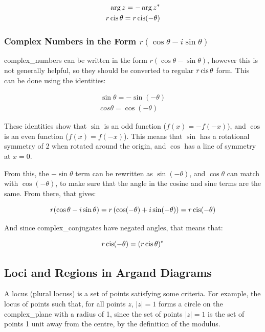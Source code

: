         \begin{align}
            \arg z=-\arg z^* \\
            r\operatorname{cis}\theta=r\operatorname{cis}(-\theta)
        \end{align}

        \subsubsection{Complex Numbers in the Form \texorpdfstring{$r(\cos\theta-i\sin\theta)$}{\textit{r(}cos\textit{θ-i}sin\textit{θ)}}} %
            \Glspl{complex_number} can be written in the form $r(\cos\theta-\sin\theta)$, however this is not generally helpful, so they should be converted to regular $r\operatorname{cis}\theta$ form.
            This can be done using the identities:

            \begin{align}
                \sin\theta=-\sin(-\theta) \\
                cos\theta=\cos(-\theta)
            \end{align}

            These identities show that $\sin$ is an odd \gls{function} ($f(x)=-f(-x)$), and $\cos$ is an even \gls{function} ($f(x)=f(-x)$).
            This means that $\sin$ has a rotational symmetry of 2 when rotated around the origin, and $\cos$ has a line of symmetry at $x=0$.

            From this, the $-\sin\theta$ term can be rewritten as $\sin(-\theta)$, and $\cos\theta$ can match with $\cos(-\theta)$, to make sure that the angle in the \gls{cosine} and \gls{sine} terms are the same.
            From there, that gives:

            \begin{equation}
                r(\cos\theta-i\sin\theta)=r\left(\cos(-\theta)+i\sin(-\theta)\right)=r\operatorname{cis}(-\theta)
            \end{equation}

            And since \glspl{complex_conjugate} have negated angles, that means that:
            
            \begin{equation}
                r\operatorname{cis}(-\theta)=(r\operatorname{cis}\theta)^*
            \end{equation}

    \subsection{Loci and Regions in Argand Diagrams} \label{ssec:loci_and_regions_in_argand_diagrams}
        A \gls{locus} (plural \glspl{locus}) is a set of points satisfying some criteria.
        For example, the \gls{locus} of points such that, for all points $z$, $|z|=1$ forms a circle on the \gls{complex_plane} with a radius of 1, since the set of points $|z|=1$ is the set of points 1 unit away from the centre, by the definition of the \gls{modulus}.

